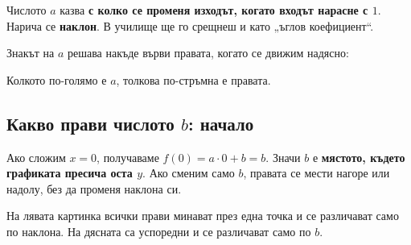 \documentclass[11pt,a4paper]{article}
\begin{document}
\begin{defbox}[Наклон]
Числото $a$ казва \textbf{с колко се променя изходът, когато входът нарасне с $1$}. Нарича се \textbf{наклон}. В училище ще го срещнеш и като „ъглов коефициент“.
\end{defbox}

Знакът на $a$ решава накъде върви правата, когато се движим надясно:

\begin{center}
\end{center}

Колкото по-голямо е $a$, толкова по-стръмна е правата.

\subsection{Какво прави числото \texorpdfstring{$b$}{b}: начало}

Ако сложим $x=0$, получаваме $f(0)=a\cdot 0+b=b$. Значи $b$ е \textbf{мястото, където графиката пресича оста $y$}.
Ако сменим само $b$, правата се мести нагоре или надолу, без да променя наклона си.

На лявата картинка всички прави минават през една точка и се различават само по наклона. На дясната са успоредни и се различават само по $b$.
\end{document}
